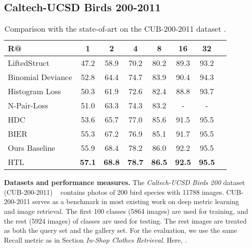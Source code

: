 \documentclass[runningheads]{llncs}
\begin{document}
\subsection{Caltech-UCSD Birds 200-2011}
\begin{table*}[t]\small
\setlength{\abovecaptionskip}{10pt}
\setlength{\belowcaptionskip}{-10pt}
\begin{center}
\resizebox{0.6\textwidth}{!}
{
\begin{tabular}{@{}lccccccc@{}}
\toprule
R@                                       & 1         &2      &4       &8      &16        &32     \\ \midrule
LiftedStruct\cite{song2016deep}                 & 47.2      &58.9   &70.2    &80.2   &89.3      &93.2   \\
Binomial Deviance\cite{ustinova2016learning}                 & 52.8      &64.4   &74.7    &83.9   &90.4      &94.3   \\
Histogram Loss\cite{ustinova2016learning}                 & 50.3      &61.9   &72.6    &82.4   &88.8      &93.7   \\
N-Pair-Loss\cite{sohn2016improved}                 & 51.0      &63.3   &74.3    &83.2   &-         &-   \\
HDC\cite{Yuan_2017_ICCV}                 & 53.6      &65.7   &77.0    &85.6   &91.5      &95.5   \\
BIER\cite{opitz2017bier}                 & 55.3      &67.2   &76.9    &85.1   &91.7      &95.5   \\\midrule
Ours Baseline                            & 55.9      &68.4   &78.2    &86.0   &92.2      &95.5   \\
HTL                                &\textbf{57.1}      &\textbf{68.8}   &\textbf{78.7}    &\textbf{86.5}   &\textbf{92.5}      &\textbf{95.5}   \\
\bottomrule
\end{tabular}
}
\end{center}
\caption{Comparison with the state-of-art on the CUB-200-2011 dataset \cite{wah2011caltech}.}
\label{cub dataset}
\end{table*}
\noindent\textbf{Datasets and performance measures.} The \emph{Caltech-UCSD Birds 200} dataset (CUB-200-2011) ~\cite{wah2011caltech} contains photos of 200 bird species with 11788 images.  CUB-200-2011 serves as a benchmark in most existing work on deep metric learning and image retrieval. The first 100 classes (5864 images) are used for training, and the rest (5924 images) of classes are used for testing. The rest images are treated as both the query set and the gallery set. For the evaluation, we use the same Recall metric as in Section \emph{In-Shop Clothes Retrieval}. Here, .
\end{document}
